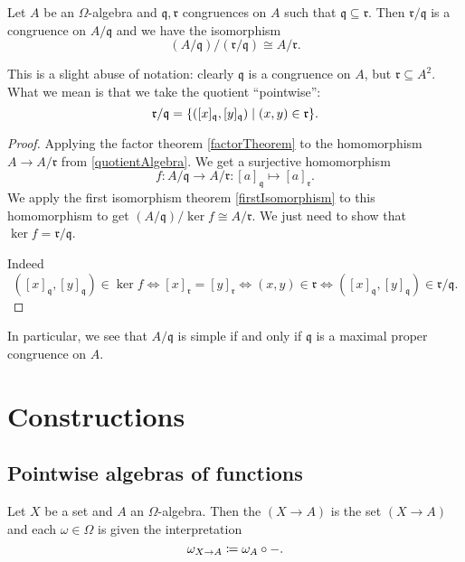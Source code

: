 \begin{theorem}
Let $A$ be an $\Omega$-algebra and $\mathfrak{q},\mathfrak{r}$ congruences on $A$ such that $\mathfrak{q} \subseteq \mathfrak{r}$. Then $\mathfrak{r}/\mathfrak{q}$ is a congruence on $A/\mathfrak{q}$ and we have the isomorphism
\[ (A/\mathfrak{q})/(\mathfrak{r}/\mathfrak{q}) \cong A/\mathfrak{r}. \]
\end{theorem}
This is a slight abuse of notation: clearly $\mathfrak{q}$ is a congruence on $A$, but $\mathfrak{r}\subseteq A^2$. What we mean is that we take the quotient ``pointwise'':
\[ \mathfrak{r}/\mathfrak{q} = \setbuilder{([x]_\mathfrak{q}, [y]_\mathfrak{q})}{(x,y)\in \mathfrak{r}}. \]
\begin{proof}
Applying the factor theorem \ref{factorTheorem} to the homomorphism $A\to A/\mathfrak{r}$ from \ref{quotientAlgebra}. We get a surjective homomorphism
\[ f: A/\mathfrak{q} \to A/\mathfrak{r}: [a]_\mathfrak{q} \mapsto [a]_{\mathfrak{r}}. \]
We apply the first isomorphism theorem \ref{firstIsomorphism} to this homomorphism to get $(A/\mathfrak{q})/\ker f \cong A/\mathfrak{r}$. We just need to show that $\ker f = \mathfrak{r}/\mathfrak{q}$.

Indeed
\[ ([x]_\mathfrak{q},[y]_\mathfrak{q}) \in \ker f \iff [x]_\mathfrak{r} = [y]_\mathfrak{r} \iff (x, y)\in \mathfrak{r} \iff ([x]_\mathfrak{q},[y]_\mathfrak{q}) \in \mathfrak{r}/\mathfrak{q}. \]
\end{proof}
In particular, we see that $A/\mathfrak{q}$ is simple if and only if $\mathfrak{q}$ is a maximal proper congruence on $A$.

\section{Constructions}
\subsection{Pointwise algebras of functions}
\begin{definition}
Let $X$ be a set and $A$ an $\Omega$-algebra. Then the  $(X\to A)$ is the set $(X\to A)$ and each $\omega\in\Omega$ is given the interpretation
\[ \omega_{X\to A} \coloneqq \omega_A\circ -.  \]
\end{definition}

